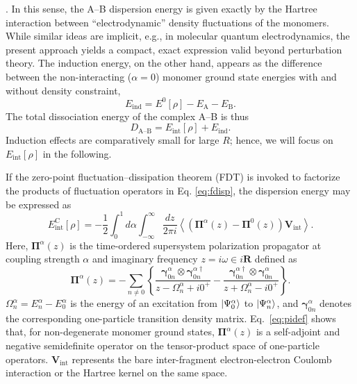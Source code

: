 \documentclass[journal=jctcce,manuscript=article]{achemso}
\begin{document}
\cite{Furche08JChemPhys129p114105}.
In this sense, the A--B dispersion energy is given exactly by the
Hartree interaction between ``electrodynamic'' density fluctuations of
the monomers. While similar ideas are implicit, e.g., in molecular
quantum electrodynamics,\cite{craig1998molecular}
the present approach yields a compact, exact expression valid beyond
perturbation theory. The induction energy, on the other hand, appears as
the difference between the non-interacting 
($\alpha =0$) monomer ground state energies with and without density
constraint,
\begin{equation}
  \label{eq:eind}
  E_{\text{ind}} = E^0[\rho] - E_{\text{A}} - E_{\text{B}}.
\end{equation}
The total dissociation energy of the complex A--B is thus
\begin{equation}
  \label{eq:etot}
  D_{\text{A--B}} = E_{\text{int}}[\rho] + E_{\text{ind}}.
\end{equation}
Induction effects are comparatively small for large $R$;\cite{doi:10.1002/wcms.86}
hence, we will focus on $E_{\text{int}}[\rho]$ in the following.

If the zero-point fluctuation--dissipation theorem (FDT) is invoked
\cite{Langreth77PhysRevB15p2884,Langreth75SolidStateCommun17p1425, 
  PhysRevB.13.4274,PhysRevB.15.6006.3,Dobson12JPhysCondensMatter24p073201}
to factorize the products of fluctuation operators in
Eq. \eqref{eq:fdisp}, the dispersion energy may be expressed as 
\begin{equation}
  \label{eq:fdt}
  E_{\text{int}}^{\text{C}}[\rho] = -\frac{1}{2} \int_0^1 d\alpha
  \int_{-\infty}^{\infty} \frac{dz}{2\pi i} 
  \left\langle
  \left(
    \boldsymbol{\Pi}^\alpha(z) - \boldsymbol{\Pi}^0(z)
  \right) 
  \mathbf{V}_{\text{int}}
  \right\rangle.
\end{equation}
Here, $\boldsymbol{\Pi}^\alpha(z)$ is the time-ordered supersystem
polarization propagator at coupling strength
$\alpha$ and imaginary frequency $z=i\omega \in i \mathbf{R}$ defined as
\cite{fetter_walecka_1971}   
\begin{equation}
  \label{eq:pidef}
  \boldsymbol{\Pi}^\alpha(z) = - \sum_{n \ne 0} \left\{
    \frac{ \boldsymbol{\gamma}_{0n}^\alpha \otimes
      \boldsymbol{\gamma}_{0n}^{\alpha \dag}} {z -
      \Omega_n^\alpha + i 0^+ } - \frac{
      \boldsymbol{\gamma}_{0n}^{\alpha \dag} \otimes 
      \boldsymbol{\gamma}_{0n}^\alpha } { z +
      \Omega_n^\alpha - i 0^+ } \right\}.
\end{equation}
$\Omega_n^\alpha = E_n^\alpha-E_0^\alpha$ is the
energy of an excitation from $\ket{\Psi^\alpha_0}$ to
$\ket{\Psi^\alpha_n}$, and $\boldsymbol{\gamma}_{0n}^\alpha$
denotes the corresponding one-particle transition density
matrix. 
Eq.~\eqref{eq:pidef} shows that, for non-degenerate monomer ground states,
$\boldsymbol{\Pi}^\alpha(z)$ 
is a self-adjoint and negative semidefinite operator on the
tensor-product space of one-particle operators.  
$\mathbf{V}_{\text{int}}$ represents the bare inter-fragment
electron-electron Coulomb interaction or the Hartree kernel on the same
space. 
\end{document}
